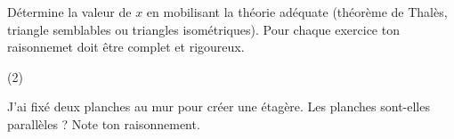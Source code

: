 \begin{exercise}[points=8]
    Détermine la valeur de $x$ en mobilisant la théorie adéquate (théorème de Thalès, triangle semblables ou triangles isométriques). Pour chaque exercice ton raisonnemet doit être complet et rigoureux.
    \begin{tasks}(2)
        \task 
        \task 
        \task 
        \task 
    \end{tasks}
\end{exercise}

\begin{exercise}[points=2]
    J'ai fixé deux planches au mur pour créer une étagère. Les planches sont-elles parallèles ? Note ton raisonnement.
    \begin{center}
        
    \end{center}
\end{exercise}

